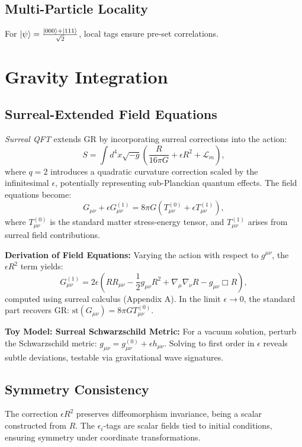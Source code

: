 \documentclass{article}
\begin{document}
\subsection{Multi-Particle Locality}
For \(\ket{\psi} = \frac{\ket{000} + \ket{111}}{\sqrt{2}}\), local tags ensure pre-set correlations.

\section{Gravity Integration}
\subsection{Surreal-Extended Field Equations}
\textit{Surreal QFT} extends GR by incorporating surreal corrections into the action:
\begin{equation}
S = \int d^4x \sqrt{-g} \left( \frac{R}{16\pi G} + \epsilon R^2 + \mathcal{L}_m \right),
\end{equation}
where \( q = 2 \) introduces a quadratic curvature correction scaled by the infinitesimal \(\epsilon\), potentially representing sub-Planckian quantum effects. The field equations become:
\begin{equation}
G_{\mu\nu} + \epsilon G_{\mu\nu}^{(1)} = 8\pi G \left( T_{\mu\nu}^{(0)} + \epsilon T_{\mu\nu}^{(1)} \right),
\end{equation}
where \( T_{\mu\nu}^{(0)} \) is the standard matter stress-energy tensor, and \( T_{\mu\nu}^{(1)} \) arises from surreal field contributions.

\textbf{Derivation of Field Equations:} Varying the action with respect to \( g^{\mu\nu} \), the \(\epsilon R^2\) term yields:
\[
G_{\mu\nu}^{(1)} = 2\epsilon \left( R R_{\mu\nu} - \frac{1}{2} g_{\mu\nu} R^2 + \nabla_\mu \nabla_\nu R - g_{\mu\nu} \Box R \right),
\]
computed using surreal calculus (Appendix A). In the limit \(\epsilon \to 0\), the standard part recovers GR: \(\text{st}(G_{\mu\nu}) = 8\pi G T_{\mu\nu}^{(0)}\).

\textbf{Toy Model: Surreal Schwarzschild Metric:} For a vacuum solution, perturb the Schwarzschild metric: \( g_{\mu\nu} = g_{\mu\nu}^{(0)} + \epsilon h_{\mu\nu} \). Solving to first order in \(\epsilon\) reveals subtle deviations, testable via gravitational wave signatures.

\subsection{Symmetry Consistency}
The correction \(\epsilon R^2\) preserves diffeomorphism invariance, being a scalar constructed from \( R \). The \(\epsilon_i\)-tags are scalar fields tied to initial conditions, ensuring symmetry under coordinate transformations.
\end{document}
